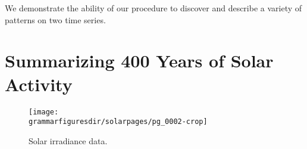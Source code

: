 







We demonstrate the ability of our procedure to discover and describe a variety of patterns on two time series.

\section{Summarizing 400 Years of Solar Activity}
\label{sec:solar}




\begin{figure}[ht!]
\centering
\texttt{[image: \\grammarfiguresdir/solarpages/pg\_0002-crop]}
\caption[Solar irradiance dataset]
{Solar irradiance data.}
\label{fig:solar}
\end{figure}


